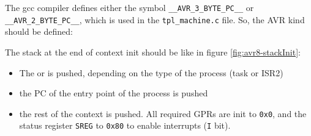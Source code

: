 
The gcc compiler defines either the symbol \texttt{\_\_AVR\_3\_BYTE\_PC\_\_} or \texttt{\_\_AVR\_2\_BYTE\_PC\_\_}, which is used in the \texttt{tpl\_machine.c} file.
So, the AVR kind should be defined:

The stack at the end of context init should be like in figure \ref{fig:avr8-stackInit}:
\begin{itemize}
\item The  or  is pushed, depending on the type of the process (task or ISR2)
\item the PC of the entry point of the process is pushed
\item the rest of the context is pushed. All required GPRs are init to \texttt{0x0}, and the status register \texttt{SREG} to \texttt{0x80} to enable interrupts (\texttt{I} bit).
\end{itemize}

